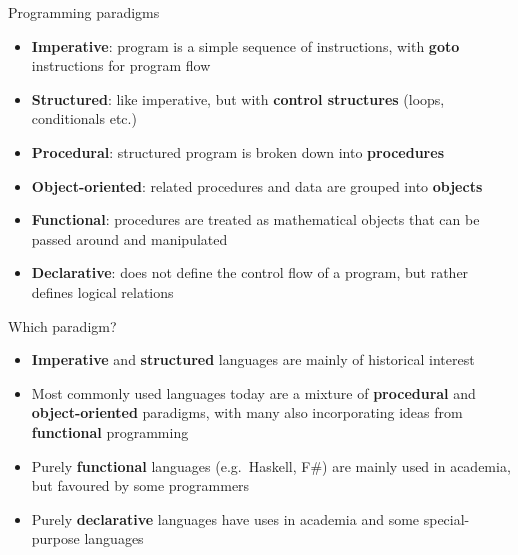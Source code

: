 \begin{frame}{Programming paradigms}
	\begin{itemize}
		\pause\item \textbf{Imperative}: program is a simple sequence of instructions,
			with \textbf{goto} instructions for program flow
		\pause\item \textbf{Structured}: like imperative, but with \textbf{control structures}
			(loops, conditionals etc.)
		\pause\item \textbf{Procedural}: structured program is broken down into
			\textbf{procedures}
		\pause\item \textbf{Object-oriented}: related procedures and data are grouped into
			\textbf{objects}
		\pause\item \textbf{Functional}: procedures are treated as mathematical objects that
			can be passed around and manipulated
		\pause\item \textbf{Declarative}: does not define the control flow of a program,
			but rather defines logical relations
	\end{itemize}
\end{frame}

\begin{frame}{Which paradigm?}
	\begin{itemize}
		\pause\item \textbf{Imperative} and \textbf{structured} languages are mainly of
			historical interest
		\pause\item Most commonly used languages today are a mixture of \textbf{procedural}
			and \textbf{object-oriented} paradigms, with many also incorporating
			ideas from \textbf{functional} programming
		\pause\item Purely \textbf{functional} languages (e.g.\ Haskell, F\#) are mainly used in academia,
			but favoured by some programmers
		\pause\item Purely \textbf{declarative} languages have uses in academia and some special-purpose languages
	\end{itemize}
\end{frame}

